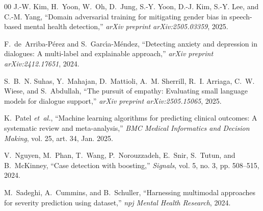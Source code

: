 \documentclass[conference]{IEEEtran}
\begin{document}
\begin{thebibliography}{00}
J.-W. Kim, H.~Yoon, W.~Oh, D.~Jung, S.-Y. Yoon, D.-J. Kim, S.-Y. Lee, and C.-M. Yang, ``Domain adversarial training for mitigating gender bias in speech-based mental health detection,'' \emph{arXiv preprint arXiv:2505.03359}, 2025.

F.~de~Arriba-P{\'e}rez and S.~Garc{\'\i}a-M{\'e}ndez, ``Detecting anxiety and depression in dialogues: A multi-label and explainable approach,'' \emph{arXiv preprint arXiv:2412.17651}, 2024.

S.~B.~N. Suhas, Y.~Mahajan, D.~Mattioli, A.~M. Sherrill, R.~I. Arriaga, C.~W. Wiese, and S.~Abdullah, ``The pursuit of empathy: Evaluating small language models for dialogue support,'' \emph{arXiv preprint arXiv:2505.15065}, 2025.

K.~Patel \emph{et~al.}, ``Machine learning algorithms for predicting clinical outcomes: A systematic review and meta-analysis,'' \emph{BMC Medical Informatics and Decision Making}, vol. 25, art. 34, Jan. 2025.

V.~Nguyen, M.~Phan, T.~Wang, P.~Norouzzadeh, E.~Snir, S.~Tutun, and B.~McKinney, ``Case detection with boosting,'' \emph{Signals}, vol. 5, no. 3, pp. 508--515, 2024.

M.~Sadeghi, A.~Cummins, and B.~Schuller, ``Harnessing multimodal approaches for severity prediction using dataset,'' \emph{npj Mental Health Research}, 2024.

\end{thebibliography}
\end{document}

